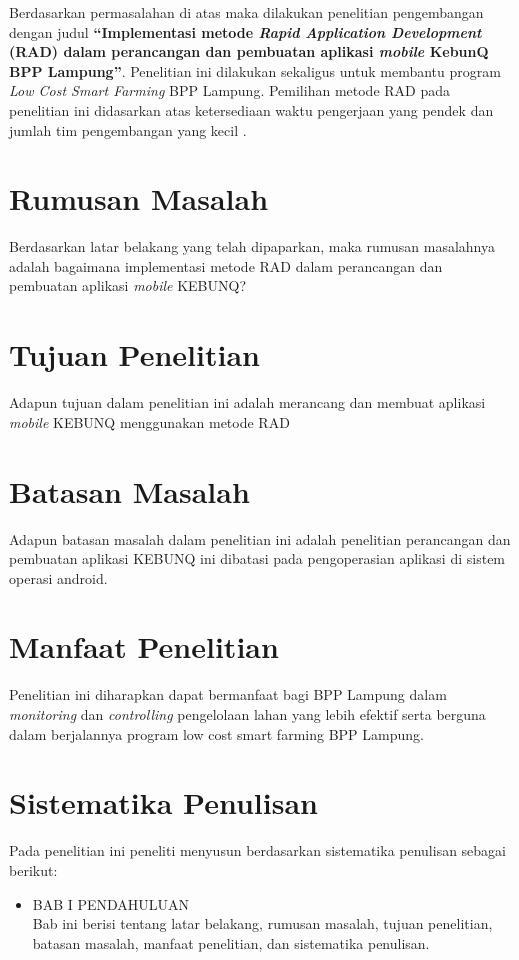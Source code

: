 \begin{flushleft}
\begin{justify}
    Berdasarkan permasalahan di atas maka dilakukan penelitian pengembangan dengan judul \textbf{“Implementasi metode \textit{Rapid Application Development} (RAD) dalam perancangan dan pembuatan aplikasi \textit{mobile} KebunQ BPP Lampung”}.  Penelitian ini dilakukan sekaligus untuk membantu program \textit{Low Cost Smart Farming} BPP Lampung. Pemilihan metode RAD pada penelitian ini didasarkan atas ketersediaan waktu pengerjaan yang pendek \cite{Sukamto} dan jumlah tim pengembangan yang kecil \cite{jurnal empiris}.
\\

    \section{Rumusan Masalah}
      Berdasarkan latar belakang yang telah dipaparkan, maka rumusan masalahnya adalah bagaimana implementasi metode RAD dalam perancangan dan pembuatan aplikasi \textit{mobile} KEBUNQ?
      \\
    \section{Tujuan Penelitian}
      Adapun tujuan dalam penelitian ini adalah merancang dan membuat aplikasi \textit{mobile} KEBUNQ menggunakan metode RAD
      \\
    \section{Batasan Masalah}
      Adapun batasan masalah dalam penelitian ini adalah penelitian perancangan dan pembuatan aplikasi KEBUNQ ini dibatasi pada pengoperasian aplikasi di sistem operasi android.
      \\
    \section{Manfaat Penelitian}
    Penelitian ini diharapkan dapat bermanfaat bagi BPP Lampung dalam \textit{monitoring} dan \textit{controlling} pengelolaan lahan yang lebih efektif serta berguna dalam berjalannya program low cost smart farming BPP Lampung.
    \\


    \section{Sistematika Penulisan}
    Pada penelitian ini peneliti menyusun berdasarkan sistematika penulisan sebagai berikut: 
      \begin{itemize}
        \item BAB I PENDAHULUAN
        \\
        Bab ini berisi tentang latar belakang, rumusan masalah, tujuan penelitian, 
        batasan masalah, manfaat penelitian, dan sistematika penulisan.


\end{itemize}
\end{justify}
\end{flushleft}
